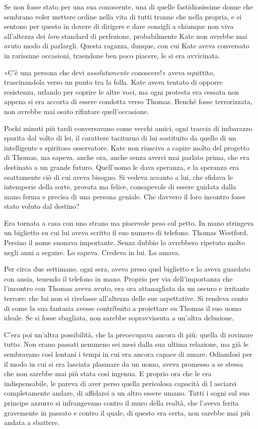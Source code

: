 \documentclass[a4paper,oneside,11pt]{memoir}
\begin{document}
Se non fosse stato per una sua conoscente, una di quelle fastidiosissime donne
che sembrano voler mettere ordine nella vita di tutti tranne che nella propria,
e si sentono per questo in dovere di dirigere e dare consigli a chiunque non
viva all'altezza dei \emph{loro} standard di perfezione, probabilmente Kate non
avrebbe mai avuto modo di parlargli. Questa ragazza, dunque, con cui Kate aveva
conversato in rarissime occasioni, traendone ben poco piacere, le si era
avvicinata.

«C'è una persona che devi \emph{assolutamente} conoscere!» aveva squittito,
trascinandola verso un punto tra la folla. Kate aveva tentato di opporre
resistenza, urlando per coprire le altre voci, ma ogni protesta era cessata non
appena si era accorta di essere condotta verso Thomas. Benché fosse
terrorizzata, non avrebbe mai osato rifiutare quell'occasione.

Pochi minuti più tardi conversavano come vecchi amici, ogni traccia di imbarazzo
sparita dal volto di lei, il carattere taciturno di lui sostituito da quello di
un intelligente e spiritoso osservatore. Kate non riusciva a capire molto del
progetto di Thomas, ma sapeva, anche ora, anche senza averci mai parlato prima,
che era destinato a un grande futuro. Quell'uomo le dava speranza, e la speranza
era esattamente ciò di cui aveva bisogno. Si vedeva accanto a lui, che sfidava
le intemperie della sorte, provata ma felice, consapevole di essere guidata
dalla mano ferma e precisa di una persona geniale. Che davvero il loro incontro
fosse stato voluto dal destino?

Era tornata a casa con uno strano ma piacevole peso sul petto. In mano stringeva
un biglietto su cui lui aveva scritto il suo numero di telefono. Thomas
Westford. Persino il nome suonava importante. Senza dubbio lo avrebbero ripetuto
molto negli anni a seguire. Lo sapeva. Credeva in lui. Lo amava.

Per circa due settimane, ogni sera, aveva preso quel biglietto e lo aveva
guardato con ansia, tenendo il telefono in mano. Proprio per via dell'importanza
che l'incontro con Thomas aveva avuto, era ora attanagliata da un oscuro e
irritante terrore: che lui non si rivelasse all'altezza delle sue aspettative.
Si rendeva conto di come la sua fantasia avesse contribuito a proiettare su
Thomas il suo uomo ideale. Se si fosse sbagliata, non sarebbe sopravvissuta a
un'altra delusione.

C'era poi un'altra possibilità, che la preoccupava ancora di più: quella di
rovinare tutto. Non erano passati nemmeno sei mesi dalla sua ultima relazione,
ma già le sembravano così lontani i tempi in cui era ancora capace di amare.
Odiandosi per il modo in cui si era lasciata plasmare da un uomo, aveva promesso
a se stessa che non sarebbe mai più stata così ingenua. E proprio ora che le era
indispensabile, le pareva di aver perso quella pericolosa capacità di l asciarsi
completamente andare, di affidarsi a un altro essere umano. Tutti i sogni sul
suo principe azzurro si infrangevano contro il muro della realtà, che l'aveva
ferita gravemente in passato e contro il quale, di questo era certa, non sarebbe
mai più andata a sbattere.
\end{document}
